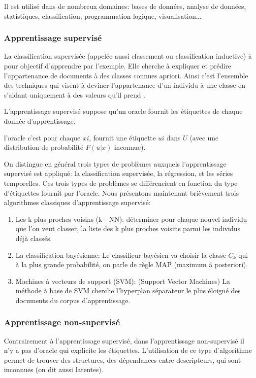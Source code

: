\documentclass[12pt]{article}
\begin{document}
Il est utilisé dans de nombreux domaines: bases de données, analyse de données, statistiques, classification, programmation logique, visualisation...
\subsubsection{Apprentissage supervisé}
La classification supervisée (appelée aussi classement ou classification inductive) à pour objectif d'apprendre par l'exemple. Elle cherche à expliquer et prédire l’appartenance de documents à des classes connues apriori. Ainsi c'est l'ensemble des techniques qui visent à deviner l'appartenance d'un individu à une classe en s'aidant uniquement à des valeurs qu'il prend \cite{2}.

L'apprentissage supervisé suppose qu'un oracle fournit les étiquettes de chaque donnée d'apprentissage.

l’oracle c’est pour chaque $xi$, fournit une étiquette $ui$ dans $U$ (avec une distribution de probabilité $F(u|x)$ inconnue).

On distingue en général trois types de problèmes auxquels l'apprentissage supervisé est appliqué: la classification supervisée, la régression, et les séries temporelles. Ces trois types de problèmes se différencient en fonction du type d'étiquettes fournit par l'oracle.
Nous présentons maintenant brièvement trois algorithmes classiques d'apprentissage supervisé:
\begin{enumerate}
	\item Les k plus proches voisins (k - NN): déterminer pour chaque nouvel individu que l'on veut classer, la liste des k plus proches voisins parmi les individus déjà classés.
	\item La classification bayésienne: Le classifieur bayésien va choisir la classe $C_k$ qui à la plus grande probabilité, on parle de règle MAP (maximum à posteriori).
	\item Machines à vecteurs de support (SVM): (Support Vector Machines) La méthode à base de SVM cherche l'hyperplan séparateur le plus éloigné des documents du corpus d'apprentissage.
\end{enumerate}

\subsubsection{Apprentissage non-supervisé}
Contrairement à l'apprentissage supervisé, dans l'apprentissage non-supervisé il n'y a pas d'oracle qui explicite les étiquettes. L'utilisation de ce type d'algorithme permet de trouver des structures, des dépendances entre descripteurs, qui sont inconnues (on dit aussi latentes). 
\end{document}
